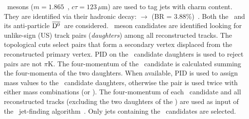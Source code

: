 \documentclass[a4paper]{jpconf}
\begin{document}
\Dzero\ mesons ($m=1.865$~\GeVcsq, $c\tau=123\,\mu$m) are used to tag jets with charm content.
They are identified via their hadronic decay: \Dzero $\rightarrow$ \pip \kam (BR = 3.88\%)~\cite{PDG:2014}. Both the \Dzero\ and its
anti-particle $\overline{\mathrm{D^{0}}}$~are considered.
\Dzero\ meson candidates are identified looking for unlike-sign (US) track pairs (\emph{daughters}) among all reconstructed tracks.
The topological cuts select pairs that form a secondary vertex displaced from the reconstructed
primary vertex. PID on the \Dzero\ candidate daughters is used to reject pairs are not $\pi$K.
The four-momentum of the \Dzero\ candidate is calculated summing the four-momenta of the two daughters.
When available, PID is used to assign mass values to the \Dzero\ candidate daughters, otherwise
the pair is used twice with either mass combinations (\pip \kam or \pim \kap). 
The four-momentum of each \Dzero\ candidate and all reconstructed tracks
(excluding the two daughters of the \Dzero) are used as input of the \antikt\ jet-finding algorithm~\cite{Cacciari:2008c}.
Only jets containing the \Dzero\ candidates are selected.
\end{document}
